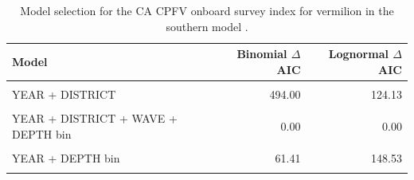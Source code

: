 \documentclass[11pt,
  english,
  a4paper,
]{article}
\begin{document}
\FloatBarrier

\begin{table}

\caption{\label{tab:tab-model-select-cpfvonboard}Model selection for the CA CPFV onboard survey index for vermilion in the southern model .}
\centering
\begin{tabular}[t]{lrr}
\toprule
Model & Binomial $\Delta$AIC & Lognormal $\Delta$AIC\\
\midrule
\cellcolor{gray!6}{1} & \cellcolor{gray!6}{725.28} & \cellcolor{gray!6}{568.97}\\
YEAR + DISTRICT & 494.00 & 124.13\\
\cellcolor{gray!6}{YEAR + DISTRICT + WAVE} & \cellcolor{gray!6}{450.48} & \cellcolor{gray!6}{109.82}\\
YEAR + DISTRICT + WAVE + DEPTH bin & 0.00 & 0.00\\
\cellcolor{gray!6}{YEAR + WAVE + DEPTH bin} & \cellcolor{gray!6}{41.38} & \cellcolor{gray!6}{132.83}\\
\addlinespace
YEAR + DEPTH bin & 61.41 & 148.53\\
\cellcolor{gray!6}{YEAR + DISTRICT + DEPTH bin} & \cellcolor{gray!6}{10.88} & \cellcolor{gray!6}{3.65}\\
\bottomrule
\end{tabular}
\end{table}

\FloatBarrier
\end{document}
